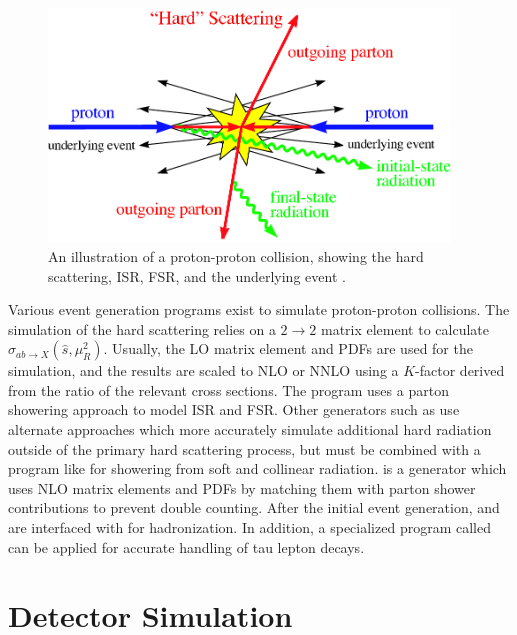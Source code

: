 \documentclass[12pt]{thesis}  %
\begin{document}
\begin{figure}[hbt]
\begin{center}
\includegraphics[width=0.95\textwidth]{figures/pp_collision_schematic.pdf}
\caption{An illustration of a proton-proton collision, showing the hard scattering, ISR, FSR, and the underlying event \cite{QuarkGluon}.}
\label{fig:pp-collision}
\end{center}
\end{figure}

Various event generation programs exist to simulate proton-proton collisions. The simulation of the hard scattering relies on a $2\rightarrow2$ matrix element to calculate $\hat{\sigma}_{ab \rightarrow X}(\hat{s},\mu_{R}^{2})$. Usually, the LO matrix element and PDFs are used for the simulation, and the results are scaled to NLO or NNLO using a $K$-factor derived from the ratio of the relevant cross sections. The program \PYTHIA \cite{Sjostrand:2006za} uses a parton showering approach to model ISR and FSR. Other generators such as \MADGRAPH \cite{MadGraph} use alternate approaches which more accurately simulate additional hard radiation outside of the primary hard scattering process, but must be combined with a program like \PYTHIA for showering from soft and collinear radiation. \POWHEG \cite{NasonPOWHEG,Alioli:2010xd} is a generator which uses NLO matrix elements and PDFs by matching them with parton shower contributions to prevent double counting. After the initial event generation, \MADGRAPH and \POWHEG are interfaced with \PYTHIA for hadronization. In addition, a specialized program called \TAUOLA \cite{TAUOLA} can be applied for accurate handling of tau lepton decays.

\section{Detector Simulation}
\end{document}
